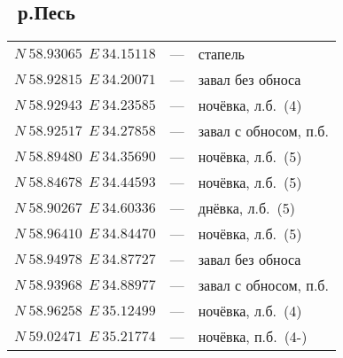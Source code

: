 \newpage 
\subsection*{~р.Песь}
\begin{longtable}[c]{>{\raggedright}m{40mm} >{\raggedleft}m{7mm}>{\raggedright}p{65mm} }
${N~58.93065~~E~34.15118}$ & --- & стапель\tabularnewline	
${N~58.92815~~E~34.20071}$ & --- & завал без обноса\tabularnewline	
${N~58.92943~~E~34.23585}$ & --- & ночёвка, л.б.~(4)\tabularnewline	
${N~58.92517~~E~34.27858}$ & --- & завал с обносом, п.б.\tabularnewline	
${N~58.89480~~E~34.35690}$ & --- & ночёвка, л.б.~(5)\tabularnewline	
${N~58.84678~~E~34.44593}$ & --- & ночёвка, л.б.~(5)\tabularnewline	
${N~58.90267~~E~34.60336}$ & --- & днёвка, л.б.~(5)\tabularnewline	
${N~58.96410~~E~34.84470}$ & --- & ночёвка, л.б.~(5)\tabularnewline	
${N~58.94978~~E~34.87727}$ & --- & завал без обноса\tabularnewline	
${N~58.93968~~E~34.88977}$ & --- & завал с обносом, п.б.\tabularnewline	
${N~58.96258~~E~35.12499}$ & --- & ночёвка, л.б.~(4)\tabularnewline	
${N~59.02471~~E~35.21774}$ & --- & ночёвка, п.б.~(4-)\tabularnewline	
\end{longtable}	